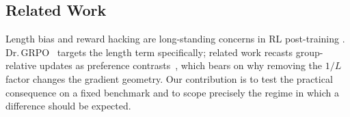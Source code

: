 \subsection{Related Work}
\label{sec:p4-related}
Length bias and reward hacking are long-standing concerns in RL post-training
\citep{ouyang2022training, christiano2017deeprlhf, ahmadian2024backtobasics}.
Dr.\,GRPO~\citep{tong2025drgrpo} targets the length term specifically; related work
recasts group-relative updates as preference contrasts~\citep{wu2025grpo_dpo, liu2026gdpo}, which bears on why removing the $1/L$ factor changes the gradient
geometry. Our contribution is to test the practical consequence on a fixed
benchmark and to scope precisely the regime in which a difference should be
expected.
